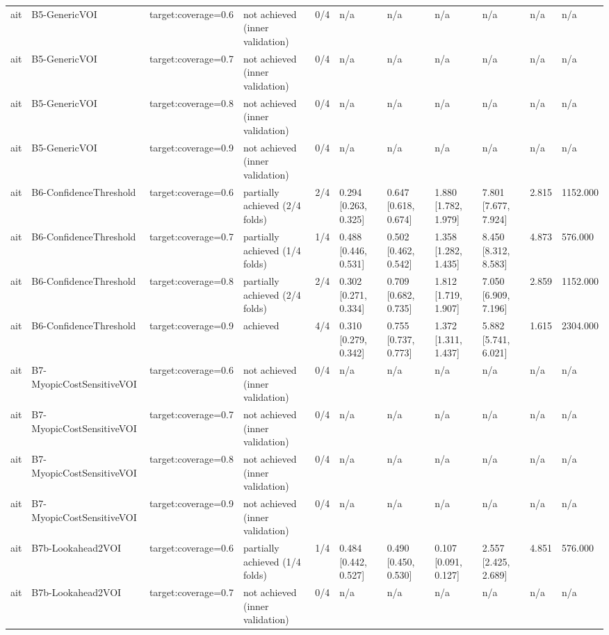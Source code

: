 \begin{table}[!ht]
{\begin{tabular}{lllllllllll}
ait & B5-GenericVOI & target:coverage=0.6 & not achieved (inner validation) & 0/4 & n/a & n/a & n/a & n/a & n/a & n/a \\
ait & B5-GenericVOI & target:coverage=0.7 & not achieved (inner validation) & 0/4 & n/a & n/a & n/a & n/a & n/a & n/a \\
ait & B5-GenericVOI & target:coverage=0.8 & not achieved (inner validation) & 0/4 & n/a & n/a & n/a & n/a & n/a & n/a \\
ait & B5-GenericVOI & target:coverage=0.9 & not achieved (inner validation) & 0/4 & n/a & n/a & n/a & n/a & n/a & n/a \\
ait & B6-ConfidenceThreshold & target:coverage=0.6 & partially achieved (2/4 folds) & 2/4 & 0.294 [0.263, 0.325] & 0.647 [0.618, 0.674] & 1.880 [1.782, 1.979] & 7.801 [7.677, 7.924] & 2.815 & 1152.000 \\
ait & B6-ConfidenceThreshold & target:coverage=0.7 & partially achieved (1/4 folds) & 1/4 & 0.488 [0.446, 0.531] & 0.502 [0.462, 0.542] & 1.358 [1.282, 1.435] & 8.450 [8.312, 8.583] & 4.873 & 576.000 \\
ait & B6-ConfidenceThreshold & target:coverage=0.8 & partially achieved (2/4 folds) & 2/4 & 0.302 [0.271, 0.334] & 0.709 [0.682, 0.735] & 1.812 [1.719, 1.907] & 7.050 [6.909, 7.196] & 2.859 & 1152.000 \\
ait & B6-ConfidenceThreshold & target:coverage=0.9 & achieved & 4/4 & 0.310 [0.279, 0.342] & 0.755 [0.737, 0.773] & 1.372 [1.311, 1.437] & 5.882 [5.741, 6.021] & 1.615 & 2304.000 \\
ait & B7-MyopicCostSensitiveVOI & target:coverage=0.6 & not achieved (inner validation) & 0/4 & n/a & n/a & n/a & n/a & n/a & n/a \\
ait & B7-MyopicCostSensitiveVOI & target:coverage=0.7 & not achieved (inner validation) & 0/4 & n/a & n/a & n/a & n/a & n/a & n/a \\
ait & B7-MyopicCostSensitiveVOI & target:coverage=0.8 & not achieved (inner validation) & 0/4 & n/a & n/a & n/a & n/a & n/a & n/a \\
ait & B7-MyopicCostSensitiveVOI & target:coverage=0.9 & not achieved (inner validation) & 0/4 & n/a & n/a & n/a & n/a & n/a & n/a \\
ait & B7b-Lookahead2VOI & target:coverage=0.6 & partially achieved (1/4 folds) & 1/4 & 0.484 [0.442, 0.527] & 0.490 [0.450, 0.530] & 0.107 [0.091, 0.127] & 2.557 [2.425, 2.689] & 4.851 & 576.000 \\
ait & B7b-Lookahead2VOI & target:coverage=0.7 & not achieved (inner validation) & 0/4 & n/a & n/a & n/a & n/a & n/a & n/a \\

\end{tabular}}
\end{table}
